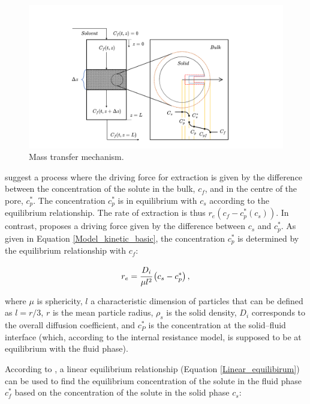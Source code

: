 \documentclass[a4paper,fleqn]{cas-dc}
\begin{document}
	\begin{figure}[h!]
		\centering
		\includegraphics[trim = 45cm 0cm 60cm 20cm,clip,width=0.85\columnwidth]{Figures/SFE_PFD.drawio.png}	
		\caption{Mass transfer mechanism.}
		\label{fig: SFE_Mechanism}
	\end{figure}
	
	\citet{Bulley1984} suggest a process where the driving force for extraction is given by the difference between the concentration of the solute in the bulk, $c_f$, and in the centre of the pore, $c_p^*$. The concentration $c_p^*$ is in equilibrium with $c_s$ according to the equilibrium relationship. The rate of extraction is thus $r_e\left(c_f - c^*_p(c_s)\right)$. In contrast, \citet{Reverchon1996} proposes a driving force given by the difference between $c_s$ and $c_p^*$. As given in Equation \ref{Model_kinetic_basic}, the concentration $c_p^*$ is determined by the equilibrium relationship with $c_f$:
	
	{\footnotesize
		\begin{equation} \label{Model_kinetic_basic}
			r_e = \cfrac{D_i}{\mu l^2 }\left(c_s - c_p^* \right),
	\end{equation} }
	
	where $\mu$ is sphericity, $l$ a characteristic dimension of particles that can be defined as $l = r/3$, $r$ is the mean particle radius, $\rho_s$ is the solid density, $D_i$ corresponds to the overall diffusion coefficient, and $c_P^*$ is the concentration at the solid--fluid interface (which, according to the internal resistance model, is supposed to be at equilibrium with the fluid phase). 
	
	According to \citet{Bulley1984}, a linear equilibrium relationship (Equation \ref{Linear_equilibirum}) can be used to find the equilibrium concentration of the solute in the fluid phase $c_f^*$ based on the concentration of the solute in the solid phase $c_s$:
	
\end{document}
